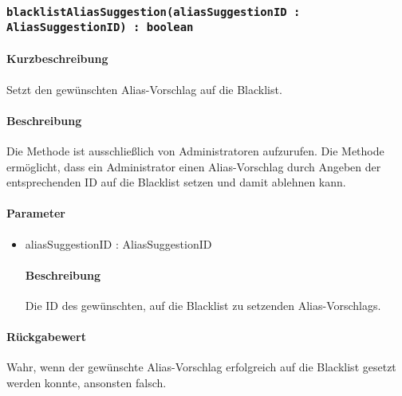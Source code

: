 \subsubsection{\texttt{blacklistAliasSuggestion(aliasSuggestionID : AliasSuggestionID) : boolean}}%
\paragraph*{Kurzbeschreibung}
Setzt den gewünschten Alias-Vorschlag auf die Blacklist.
\paragraph*{Beschreibung}
Die Methode ist ausschließlich von Administratoren aufzurufen.
Die Methode ermöglicht, dass ein Administrator einen Alias-Vorschlag durch Angeben der entsprechenden ID auf die Blacklist setzen und damit ablehnen kann.
\paragraph*{Parameter}
\begin{itemize}
	\item aliasSuggestionID : AliasSuggestionID
		\paragraph*{Beschreibung}
		Die ID des gewünschten, auf die Blacklist zu setzenden Alias-Vorschlags.
\end{itemize}
\paragraph*{Rückgabewert}
Wahr, wenn der gewünschte Alias-Vorschlag erfolgreich auf die Blacklist gesetzt werden konnte, ansonsten falsch.
